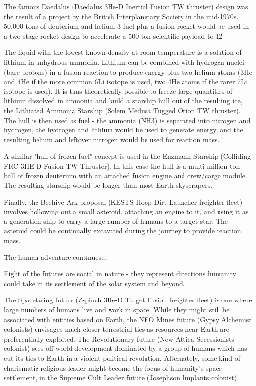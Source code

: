 \documentclass[a4paper]{book}
\begin{document}
The famous Daedalus (Daedalus 3He-D Inertial Fusion TW thruster) design was the result of a project by the British Interplanetary Society in the mid-1970s. 50,000 tons of deuterium and helium-3 fuel plus a fusion rocket would be used in a two-stage rocket design to accelerate a 500 ton scientific payload to 12%

The liquid with the lowest known density at room temperature is a solution of lithium in anhydrous ammonia. Lithium can be combined with hydrogen nuclei (bare protons) in a fusion reaction to produce energy plus two helium atoms (3He and 4He if the more common 6Li isotope is used, two 4He atoms if the rarer 7Li isotope is used). It is thus theoretically possible to freeze large quantities of lithium dissolved in ammonia and build a starship hull out of the resulting ice, the Lithiated Ammonia Starship (Solem Medusa Tugged Orion TW thruster). The hull is then used as fuel - the ammonia (NH3) is separated into nitrogen and hydrogen, the hydrogen and lithium would be used to generate energy, and the resulting helium and leftover nitrogen would be used for reaction mass.

A similar "hull of frozen fuel" concept is used in the Enzmann Starship (Colliding FRC 3HE-D Fusion TW Thruster). In this case the hull is a multi-million ton ball of frozen deuterium with an attached fusion engine and crew/cargo module. The resulting starship would be longer than most Earth skyscrapers.

Finally, the Beehive Ark proposal (KESTS Hoop Dirt Launcher freighter fleet) involves hollowing out a small asteroid, attaching an engine to it, and using it as a generation ship to carry a large number of humans to a target star. The asteroid could be continually excavated during the journey to provide reaction mass.

The human adventure continues...

Eight of the futures are social in nature - they represent directions humanity could take in its settlement of the solar system and beyond.

The Spacefaring future (Z-pinch 3He-D Target Fusion freighter fleet) is one where large numbers of humans live and work in space. While they might still be associated with entities based on Earth, the NEO Mines future (Gypsy Alchemist colonists) envisages much closer terrestrial ties as resources near Earth are preferentially exploited. The Revolutionary future (New Attica Secessionists colonist) sees off-world development dominated by a group of humans which has cut its ties to Earth in a violent political revolution. Alternately, some kind of charismatic religious leader might become the focus of humanity's space settlement, in the Supreme Cult Leader future (Josephson Implants colonist).
\end{document}
